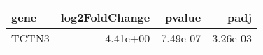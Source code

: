 \begin{tabular}{lrrr}
\toprule
 gene &  log2FoldChange &   pvalue &     padj \\
\midrule
TCTN3 &        4.41e+00 & 7.49e-07 & 3.26e-03 \\
\bottomrule
\end{tabular}
